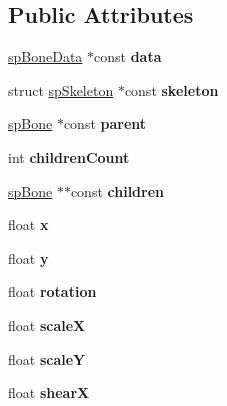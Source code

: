 \subsection*{Public Attributes}
\begin{DoxyCompactItemize}
\item 
\mbox{\label{structspBone_afe64afc97b08d0ab4c0ff029bc93d960}} 
\hyperlink{structspBoneData}{sp\+Bone\+Data} $\ast$const {\bfseries data}
\item 
\mbox{\label{structspBone_aae445f61bb3499fdc15f05136c1b75f6}} 
struct \hyperlink{structspSkeleton}{sp\+Skeleton} $\ast$const {\bfseries skeleton}
\item 
\mbox{\label{structspBone_a55285fa9579abd27c7d0b5d183dc1630}} 
\hyperlink{structspBone}{sp\+Bone} $\ast$const {\bfseries parent}
\item 
\mbox{\label{structspBone_aca9034ed9486b219d5103b8e14836891}} 
int {\bfseries children\+Count}
\item 
\mbox{\label{structspBone_a8b32786cb4f4f7a9da04117f4a2b0177}} 
\hyperlink{structspBone}{sp\+Bone} $\ast$$\ast$const {\bfseries children}
\item 
\mbox{\label{structspBone_a34ee977382d904b9c983a0ba060f6a22}} 
float {\bfseries x}
\item 
\mbox{\label{structspBone_ac1e7ac2a2bae2788ca7bcff6bded387a}} 
float {\bfseries y}
\item 
\mbox{\label{structspBone_a385e0fa9c782ad356b96f7ee024f69af}} 
float {\bfseries rotation}
\item 
\mbox{\label{structspBone_adeec33e1dc696f60feb484de61e05bda}} 
float {\bfseries scaleX}
\item 
\mbox{\label{structspBone_a5a032cc4907162121a8e39fb08794111}} 
float {\bfseries scaleY}
\item 
\mbox{\label{structspBone_ad427cda4ec4b0fb1ed26965a2572a38a}} 
float {\bfseries shearX}
$$
\end{DoxyCompactItemize}

